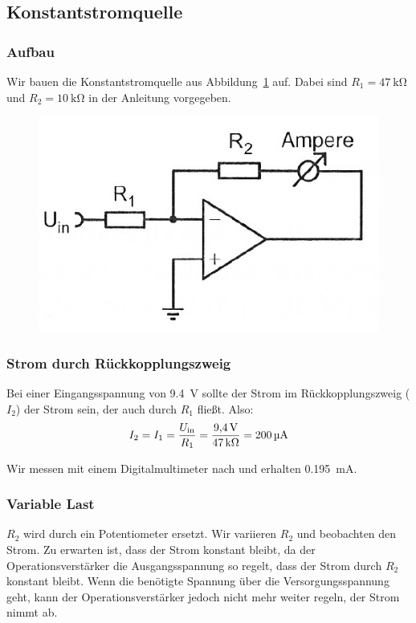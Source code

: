 \FloatBarrier
\subsection{Konstantstromquelle}

\subsubsection{Aufbau}

Wir bauen die Konstantstromquelle aus Abbildung~\ref{fig:5-1} auf. Dabei sind
$R_1 = \SI{47}{\kilo\ohm}$ und $R_2 = \SI{10}{\kilo\ohm}$ in der Anleitung
vorgegeben.

\begin{figure}[htbp]
	\centering
	\includegraphics[width=.5\linewidth]{Anleitung/5-1.png}
	\caption{%
		\cite[Abbildung~5.1]{physik313-Anleitung}
	}
	\label{fig:5-1}
\end{figure}

\subsubsection{Strom durch Rückkopplungszweig}

Bei einer Eingangsspannung von \SI{9.4}{\volt} sollte der Strom im
Rückkopplungszweig ($I_2$) der Strom sein, der auch durch $R_1$ fließt. Also:
\[
	I_2
	= I_1
	= \frac{U_\text{in}}{R_1}
	= \frac{\SI{9.4}\volt}{\SI{47}{\kilo\ohm}}
	= \SI{200}{\micro\ampere}
\]

Wir messen mit einem Digitalmultimeter nach und erhalten
\SI{.195}{\milli\ampere}.

\subsubsection{Variable Last}

$R_2$ wird durch ein Potentiometer ersetzt. Wir variieren $R_2$ und beobachten
den Strom. Zu erwarten ist, dass der Strom konstant bleibt, da der
Operationsverstärker die Ausgangsspannung so regelt, dass der Strom durch $R_2$
konstant bleibt. Wenn die benötigte Spannung über die Versorgungsspannung geht,
kann der Operationsverstärker jedoch nicht mehr weiter regeln, der Strom nimmt
ab.

